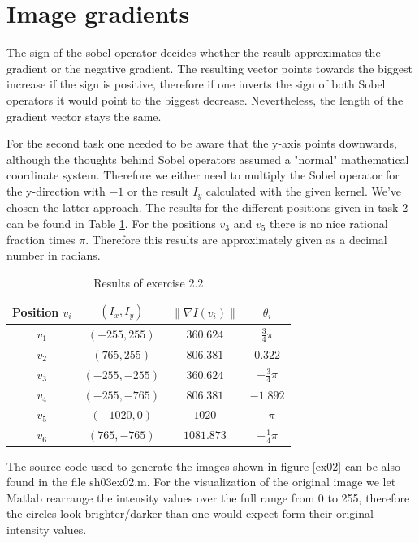 \documentclass{article}
\newcommand{\norm}[1]{\left\lVert#1\right\rVert}
\begin{document}
\clearpage
\section{Image gradients}
The sign of the sobel operator decides whether the result approximates the gradient or the negative gradient. The resulting vector points towards the biggest increase if the sign is positive, therefore if one inverts the sign of both Sobel operators it would point to the biggest decrease. Nevertheless, the length of the gradient vector stays the same.

For the second task one needed to be aware that the y-axis points downwards, although the thoughts behind Sobel operators assumed a "normal" mathematical coordinate system. Therefore we either need to multiply the Sobel operator for the y-direction with $-1$ or the result $I_y$ calculated with the given kernel. We've chosen the latter approach. The results for the different positions given in task 2 can be found in Table \ref{tab1}. For the positions $v_3$ and $v_5$ there is no nice rational fraction times $\pi$. Therefore this results are approximately given as a decimal number in radians.

\begin{table}[H]
  \centering
  \label{tab1}
  \caption{Results of exercise 2.2}
  \begin{tabular}{cccc}
    \toprule
    Position $v_i$ & $(I_x, I_y)$   & $\norm{\nabla I(v_i)}$ & $\theta_i$        \\
    \midrule
    $v_1$          & $(-255, 255)$  & $360.624$              & $\frac{3}{4}\pi$  \\
    $v_2$          & $(765, 255)$   & $806.381$              & $0.322$           \\
    $v_3$          & $(-255, -255)$ & $360.624$              & $-\frac{3}{4}\pi$ \\
    $v_4$          & $(-255, -765)$ & $806.381$              & $-1.892$          \\
    $v_5$          & $(-1020, 0)$   & $1020$                 & $-\pi$            \\
    $v_6$          & $(765, -765)$  & $1081.873$             & $-\frac{1}{4}\pi$ \\
    \bottomrule
  \end{tabular}
\end{table}

The source code used to generate the images shown in figure \ref{ex02} can be also found in the file sh03ex02.m. For the visualization of the original image we let Matlab rearrange the intensity values over the full range from 0 to 255, therefore the circles look brighter/darker than one would expect form their original intensity values.
\end{document}

